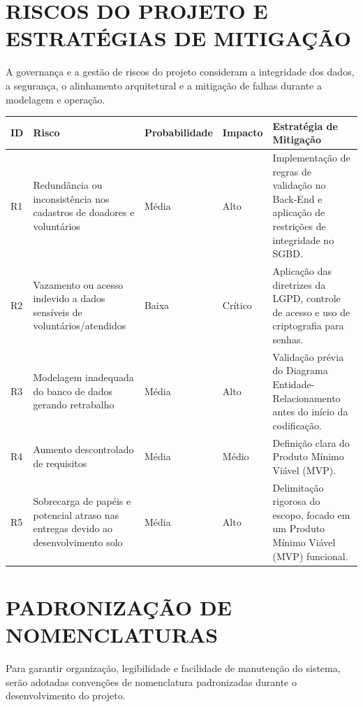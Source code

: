 \documentclass[12pt,a4paper]{article}
\begin{document}
\section*{RISCOS DO PROJETO E ESTRATÉGIAS DE MITIGAÇÃO}

A governança e a gestão de riscos do projeto consideram a integridade
dos dados, a segurança, o alinhamento arquitetural e a mitigação de
falhas durante a modelagem e operação.

\begin{longtable}{P{0.8cm}P{3.1cm}P{2cm}P{1.8cm}P{6cm}}
\toprule
\textbf{ID} & \textbf{Risco} & \textbf{Probabilidade} &
\textbf{Impacto} & \textbf{Estratégia de Mitigação}\\
\midrule
R1 &
Redundância ou inconsistência nos cadastros de doadores e voluntários &
Média & Alto &
Implementação de regras de validação no Back-End e aplicação de
restrições de integridade no SGBD.\\

R2 &
Vazamento ou acesso indevido a dados sensíveis de
voluntários/atendidos &
Baixa & Crítico &
Aplicação das diretrizes da LGPD, controle de acesso e uso de
criptografia para senhas.\\

R3 &
Modelagem inadequada do banco de dados gerando retrabalho &
Média & Alto &
Validação prévia do Diagrama Entidade-Relacionamento antes do início
da codificação.\\

R4 &
Aumento descontrolado de requisitos &
Média & Médio &
Definição clara do Produto Mínimo Viável (MVP).\\

R5 &
Sobrecarga de papéis e potencial atraso nas entregas devido ao
desenvolvimento solo &
Média & Alto &
Delimitação rigorosa do escopo, focado em um Produto Mínimo Viável
(MVP) funcional.\\
\bottomrule
\end{longtable}


\section*{PADRONIZAÇÃO DE NOMENCLATURAS}

Para garantir organização, legibilidade e facilidade de manutenção do
sistema, serão adotadas convenções de nomenclatura padronizadas durante
o desenvolvimento do projeto.
\end{document}
